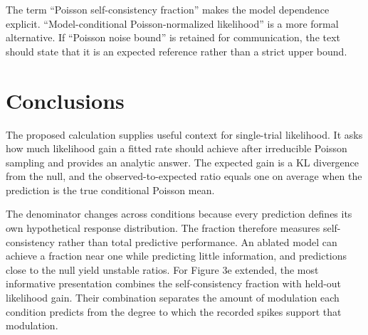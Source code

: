 \documentclass[11pt]{article}
\begin{document}
The term ``Poisson self-consistency fraction'' makes the model dependence explicit. ``Model-conditional Poisson-normalized likelihood'' is a more formal alternative. If ``Poisson noise bound'' is retained for communication, the text should state that it is an expected reference rather than a strict upper bound.

\section{Conclusions}

The proposed calculation supplies useful context for single-trial likelihood. It asks how much likelihood gain a fitted rate should achieve after irreducible Poisson sampling and provides an analytic answer. The expected gain is a KL divergence from the null, and the observed-to-expected ratio equals one on average when the prediction is the true conditional Poisson mean.

The denominator changes across conditions because every prediction defines its own hypothetical response distribution. The fraction therefore measures self-consistency rather than total predictive performance. An ablated model can achieve a fraction near one while predicting little information, and predictions close to the null yield unstable ratios. For Figure 3e extended, the most informative presentation combines the self-consistency fraction with held-out likelihood gain. Their combination separates the amount of modulation each condition predicts from the degree to which the recorded spikes support that modulation.
\end{document}
